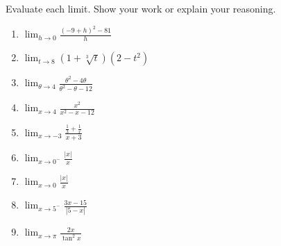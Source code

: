 \documentclass[11pt,fleqn]{article}
\begin{document}
\setlength{\parindent}{0cm}
\renewcommand{\headrulewidth}{0pt}
\newcommand{\blank}[1]{\rule{#1}{0.75pt}}
\renewcommand{\d}{\displaystyle}
\vspace*{-0.9in}
\begin{center}
  \Large {}
\end{center}
\small
Evaluate each limit. Show your work or explain your reasoning.
\begin{enumerate}
\item $\displaystyle{\lim_{h \to 0 }\frac{(-9+h)^2-81}{h}}$
\vfill
\item $\displaystyle{\lim_{t \to 8 }(1+\sqrt[3]{t})(2-t^2)}$
\vfill
\item $\displaystyle{\lim_{\theta \to 4}\frac{\theta^2-4\theta}{\theta^2-\theta-12}}$
\vfill

\item $\displaystyle{\lim_{x \to 4}\frac{x^2}{x^2-x-12}}$
\vfill

\item $\displaystyle{\lim_{x \to -3 }\frac{\frac{1}{3}+\frac{1}{x}}{x+3}}$
\vspace{2in}
\newpage

\item $\displaystyle{\lim_{x \to 0^-}\frac{|x|}{x}}$
\vfill

\item $\displaystyle{\lim_{x \to 0}\frac{|x|}{x}}$
\vfill

\item $\displaystyle{\lim_{x \to 5^-}\frac{3x-15}{|5-x|}}$
\vfill

\item $\displaystyle{\lim_{x \to \pi}\frac{2x}{\tan^2 x}}$
\vfill

\end{enumerate}
 
\end{document}
